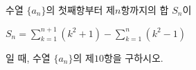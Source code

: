 수열 $\{a_n\}$의 첫째항부터 제$n$항까지의 합 $S_n$이 \par\smallskip\noindent\hspace*{1.5em}$S_n=\displaystyle\sum_{k=1}^{n+1}(k^2+1)-\sum_{k=1}^{n}(k^2-1)$\par\smallskip\noindent 일 때, 수열 $\{a_n\}$의 제$10$항을 구하시오.

